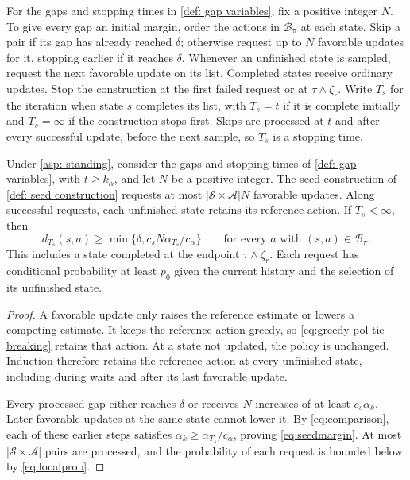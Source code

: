 \begin{definition}
\label{def: seed construction}
For the gaps and stopping times in \autoref{def: gap variables}, fix a positive integer $N$. To give every gap an initial margin, order the actions in $\mathcal B_\pi$ at each state. Skip a pair if its gap has already reached $\delta$; otherwise request up to $N$ favorable updates for it, stopping earlier if it reaches $\delta$. Whenever an unfinished state is sampled, request the next favorable update on its list. Completed states receive ordinary updates. Stop the construction at the first failed request or at $\tau\wedge\zeta_r$.
Write $T_s$ for the iteration when state $s$ completes its list, with $T_s=t$ if it is complete initially and $T_s=\infty$ if the construction stops first. Skips are processed at $t$ and after every successful update, before the next sample, so $T_s$ is a stopping time.
\end{definition}

\begin{lemma}[Seed]
\label{lem:seeds}
Under \autoref{asp: standing}, consider the gaps and stopping times of \autoref{def: gap variables}, with $t\ge k_\alpha$, and let $N$ be a positive integer. The seed construction of \autoref{def: seed construction} requests at most $|\mathcal S\times\mathcal A|N$ favorable updates. Along successful requests, each unfinished state retains its reference action. If $T_s<\infty$, then
\begin{equation}
\label{eq:seedmargin}
d_{T_s}(s,a)\ge\min\{\delta,c_sN\alpha_{T_s}/c_\alpha\}
\qquad\text{for every }a\text{ with }(s,a)\in\mathcal B_\pi.
\end{equation}
This includes a state completed at the endpoint $\tau\wedge\zeta_r$. Each request has conditional probability at least $p_0$ given the current history and the selection of its unfinished state.
\end{lemma}
\begin{proof}
A favorable update only raises the reference estimate or lowers a competing estimate. It keeps the reference action greedy, so \eqref{eq:greedy-pol-tie-breaking} retains that action. At a state not updated, the policy is unchanged. Induction therefore retains the reference action at every unfinished state, including during waits and after its last favorable update.

Every processed gap either reaches $\delta$ or receives $N$ increases of at least $c_s\alpha_k$. Later favorable updates at the same state cannot lower it. By \eqref{eq:comparison}, each of these earlier steps satisfies $\alpha_k\ge\alpha_{T_s}/c_\alpha$, proving \eqref{eq:seedmargin}.
At most $|\mathcal S\times\mathcal A|$ pairs are processed, and the probability of each request is bounded below by \eqref{eq:localprob}.
\end{proof}

